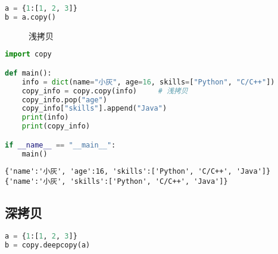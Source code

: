 \begin{lstlisting}[language=Python]
a = {1:[1, 2, 3]}
b = a.copy()
\end{lstlisting}

\begin{figure}[H]
	\centering
	\caption{浅拷贝}
\end{figure}

\vspace{0.5cm}


\begin{lstlisting}[language=Python]
import copy

def main():
    info = dict(name="小灰", age=16, skills=["Python", "C/C++"])
    copy_info = copy.copy(info)     # 浅拷贝
    copy_info.pop("age")
    copy_info["skills"].append("Java")
    print(info)
    print(copy_info)

if __name__ == "__main__":
    main()
\end{lstlisting}

\begin{tcolorbox}
	\begin{verbatim}
{'name':'小灰', 'age':16, 'skills':['Python', 'C/C++', 'Java']}
{'name':'小灰', 'skills':['Python', 'C/C++', 'Java']}
\end{verbatim}
\end{tcolorbox}

\vspace{0.5cm}

\subsection{深拷贝}

\vspace{-0.5cm}

\begin{lstlisting}[language=Python]
a = {1:[1, 2, 3]}
b = copy.deepcopy(a)
\end{lstlisting}

